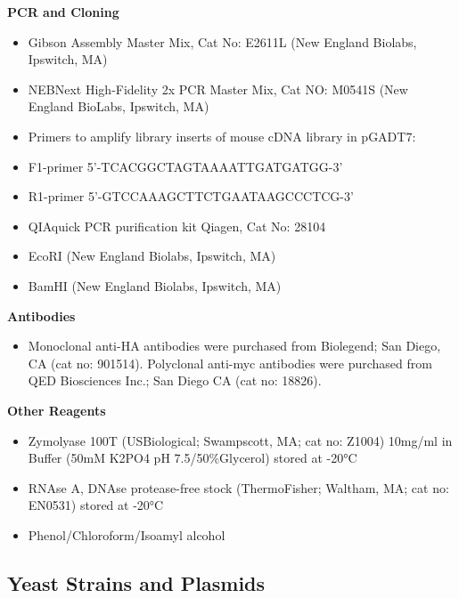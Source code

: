 \documentclass[11pt,fleqn]{book} %
\begin{document}
\textbf{PCR and Cloning}

\begin{itemize}
    \item Gibson Assembly Master Mix, Cat No: E2611L (New England Biolabs, Ipswitch, MA)
    \item NEBNext High-Fidelity 2x PCR Master Mix, Cat NO: M0541S (New England BioLabs, Ipswitch, MA)
    \item Primers to amplify library inserts of mouse cDNA library in pGADT7:

    \item F1-primer 5’-TCACGGCTAGTAAAATTGATGATGG-3’

    \item R1-primer 5’-GTCCAAAGCTTCTGAATAAGCCCTCG-3’
    \item QIAquick PCR purification kit Qiagen, Cat No: 28104
    \item EcoRI (New England Biolabs, Ipswitch, MA)
    \item BamHI (New England Biolabs, Ipswitch, MA)
\end{itemize}


\textbf{Antibodies}

\begin{itemize}
    \item Monoclonal anti-HA antibodies were purchased from Biolegend; San Diego, CA (cat no: 901514).  Polyclonal anti-myc antibodies were purchased from QED Biosciences Inc.; San Diego CA (cat no: 18826).
\end{itemize}

\textbf{Other Reagents}

\begin{itemize}
    \item Zymolyase 100T (USBiological; Swampscott, MA; cat no: Z1004) 10mg/ml in Buffer (50mM K2PO4 pH 7.5/50\%Glycerol) stored at -20°C
    \item RNAse A, DNAse protease-free stock (ThermoFisher; Waltham, MA; cat no: EN0531) stored at -20°C
    \item Phenol/Chloroform/Isoamyl alcohol
\end{itemize}

\subsection{Yeast Strains and Plasmids}
\end{document}
